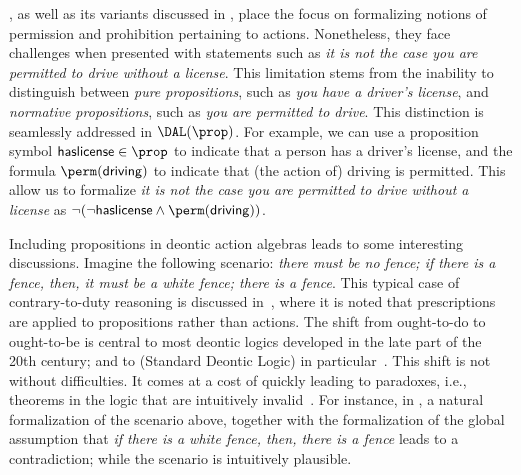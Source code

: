 \DAL, as well as its variants discussed in , place the focus on formalizing notions of permission and prohibition pertaining to actions.
Nonetheless, they face challenges when presented with statements such as \emph{it is not the case you are permitted to drive without a license}.
This limitation stems from the inability to distinguish between \emph{pure propositions}, such as \emph{you have a driver's license}, and \emph{normative propositions}, such as \emph{you are permitted to drive}.
This distinction is seamlessly addressed in $\DAL(\prop)$.
For example, we can use a proposition symbol $\mathsf{haslicense} \in \prop$ to indicate that a person has a driver's license, and the formula $\perm(\mathsf{driving})$ to indicate that (the action of) driving is permitted.
This allow us to formalize \emph{it is not the case you are permitted to drive without a license} as $\lnot(\lnot\mathsf{haslicense} \land \perm(\mathsf{driving}))$.

Including propositions in deontic action algebras leads to some interesting discussions.
Imagine the following scenario: \emph{there must be no fence;  if there is a fence, then, it must be a white fence; there is a fence}.
This typical case of contrary-to-duty reasoning is discussed in~\cite{Prakken:1996}, where it is noted that prescriptions are applied to propositions rather than actions.
%
The shift from ought-to-do to ought-to-be is central to most deontic logics developed in the late part of the 20th century; and to \SDL (Standard Deontic Logic) in particular~\cite{Aqvist:2002}.
This shift is not without difficulties. It comes at a cost of quickly leading to paradoxes, i.e., theorems in the logic that are intuitively invalid~\cite{Aqvist:2002,Meyer:1994}.
For instance, in \SDL, a natural formalization of the scenario above, together with the formalization of the global assumption that \emph{if there is a white fence, then, there is a fence} leads to a contradiction; while the scenario is intuitively plausible.

